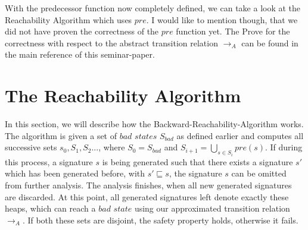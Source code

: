 \noindent
With the predecessor function now completely defined, we can take a look at the Reachability Algorithm which uses $pre$. 
I would like to mention though, that we did not have proven the correctness of the $pre$ function yet. The Prove for the correctness
with respect to the abstract transition relation $\longrightarrow_A$ can be found in the main reference of this seminar-paper.\cite{abdulla2013monotonic}

\section{The Reachability Algorithm}
In this section, we will describe how the Backward-Reachability-Algorithm works. The algorithm is given a set of $bad$ $states$ 
$S_{bad}$ as defined earlier and computes all successive sets $s_0, S_1, S_2 ...$, where $S_0 = S_{bad}$ and
$S_{i + 1} = \bigcup_{s \in S_i} pre(s)$. If during this process, a signature $s$ is being generated such that there exists a signature
$s'$ which has been generated before, with $s' \sqsubseteq s$, the signature $s$ can be omitted from further analysis. The analysis
finishes, when all new generated signatures are discarded. At this point, all generated signatures left denote exactly these heaps,
which can reach a $bad$ $state$ using our approximated transition relation $\longrightarrow_A$. If both these sets are disjoint, 
the safety property holds, otherwise it fails. 

